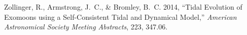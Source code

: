 \documentclass[11pt]{article}
\begin{document}




Zollinger, R., Armstrong, J.\ C., \& Bromley, B.\ C. 2014, ``Tidal
Evolution of Exomoons using a Self-Consistent Tidal and Dynamical
Model,'' {\em American Astronomical Society Meeting Abstracts}, 223, 347.06.








\end{document}

